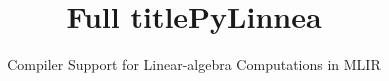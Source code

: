 \documentclass[conference]{IEEEtran}
\begin{document}
\ifx\paperversion\paperversioncameraIEEE
  \title{Full title}
\else
  \title[]{PyLinnea}       %
  \subtitle{Compiler Support for Linear-algebra Computations in MLIR} %
\fi


\end{document}
